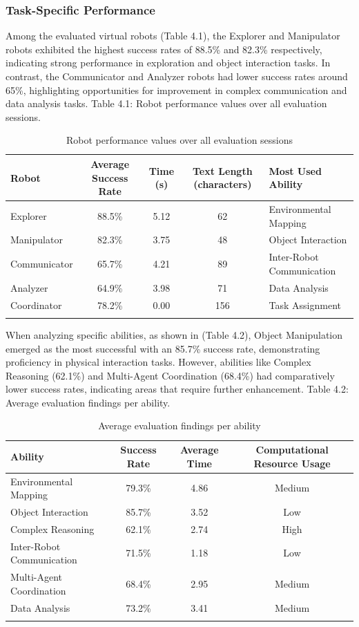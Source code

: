\documentclass[pdflatex,sn-mathphys-num]{sn-jnl}%
\theoremstyle{thmstyleone}%
\theoremstyle{thmstyletwo}%
\theoremstyle{thmstylethree}%
\begin{document}
\subsubsection{Task-Specific Performance}
Among the evaluated virtual robots (Table 4.1), the Explorer and Manipulator robots exhibited the highest success rates of 88.5\% and 82.3\% respectively, indicating strong performance in exploration and object interaction tasks. In contrast, the Communicator and Analyzer robots had lower success rates around 65\%, highlighting opportunities for improvement in complex communication and data analysis tasks.
Table 4.1: Robot performance values over all evaluation sessions.
\begin{table}[h]
\caption{Robot performance values over all evaluation sessions}\label{tab1}
\begin{tabular*}{\textwidth}{@{\extracolsep\fill}lcccl}
\toprule
Robot & Average Success Rate & Time (s) & Text Length (characters) & Most Used Ability \\
\midrule
Explorer & 88.5\% & 5.12 & 62 & Environmental Mapping \\
Manipulator & 82.3\% & 3.75 & 48 & Object Interaction \\
Communicator & 65.7\% & 4.21 & 89 & Inter-Robot Communication \\
Analyzer & 64.9\% & 3.98 & 71 & Data Analysis \\
Coordinator & 78.2\% & 0.00 & 156 & Task Assignment \\
\botrule
\end{tabular*}
\end{table}

When analyzing specific abilities, as shown in (Table 4.2), Object Manipulation emerged as the most successful with an 85.7\% success rate, demonstrating proficiency in physical interaction tasks. However, abilities like Complex Reasoning (62.1\%) and Multi-Agent Coordination (68.4\%) had comparatively lower success rates, indicating areas that require further enhancement.
Table 4.2: Average evaluation findings per ability.
\begin{table}[h]
\caption{Average evaluation findings per ability}\label{tab2}
\begin{tabular*}{\textwidth}{@{\extracolsep\fill}lccc}
\toprule
Ability & Success Rate & Average Time & Computational Resource Usage \\
\midrule
Environmental Mapping & 79.3\% & 4.86 & Medium \\
Object Interaction & 85.7\% & 3.52 & Low \\
Complex Reasoning & 62.1\% & 2.74 & High \\
Inter-Robot Communication & 71.5\% & 1.18 & Low \\
Multi-Agent Coordination & 68.4\% & 2.95 & Medium \\
Data Analysis & 73.2\% & 3.41 & Medium \\
\botrule
\end{tabular*}
\end{table}
\end{document}
